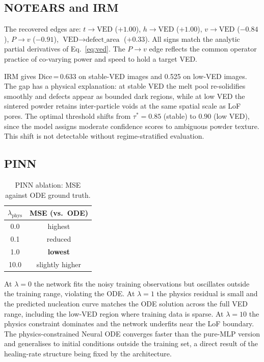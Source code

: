 \documentclass[10pt,twocolumn]{article}
\begin{document}
\subsection{NOTEARS and IRM}

The recovered edges are: $t\to\text{VED}$ ($+1.00$),
$h\to\text{VED}$ ($+1.00$), $v\to\text{VED}$ ($-0.84$),
$P\to v$ ($-0.91$), $\text{VED}\to\text{defect\_area}$ ($+0.33$).
All signs match the analytic partial derivatives of
Eq.~\eqref{eq:ved}. The $P\to v$ edge reflects the common
operator practice of co-varying power and speed to hold a target VED.

IRM gives Dice\,=\,0.633 on stable-VED images and 0.525 on low-VED
images. The gap has a physical explanation: at stable VED the melt
pool re-solidifies smoothly and defects appear as bounded dark
regions, while at low VED the sintered powder retains inter-particle
voids at the same spatial scale as LoF pores.
The optimal threshold shifts from $\tau^*=0.85$ (stable) to
$0.90$ (low VED), since the model assigns moderate confidence scores
to ambiguous powder texture. This shift is not detectable without
regime-stratified evaluation.

\subsection{PINN}

\begin{table}[h]
\centering
\caption{PINN ablation: MSE against ODE ground truth.}
\label{tab:pinn}
\small
\begin{tabular}{cc}
\toprule
$\lambda_{\text{phys}}$ & MSE (vs.\ ODE) \\
\midrule
0.0  & highest \\
0.1  & reduced \\
1.0  & \textbf{lowest} \\
10.0 & slightly higher \\
\bottomrule
\end{tabular}
\end{table}

At $\lambda=0$ the network fits the noisy training observations but
oscillates outside the training range, violating the ODE.
At $\lambda=1$ the physics residual is small and the predicted
nucleation curve matches the ODE solution across the full VED range,
including the low-VED region where training data is sparse.
At $\lambda=10$ the physics constraint dominates and the network
underfits near the LoF boundary.
The physics-constrained Neural ODE converges faster than the
pure-MLP version and generalises to initial conditions outside
the training set, a direct result of the healing-rate structure
being fixed by the architecture.
\end{document}
